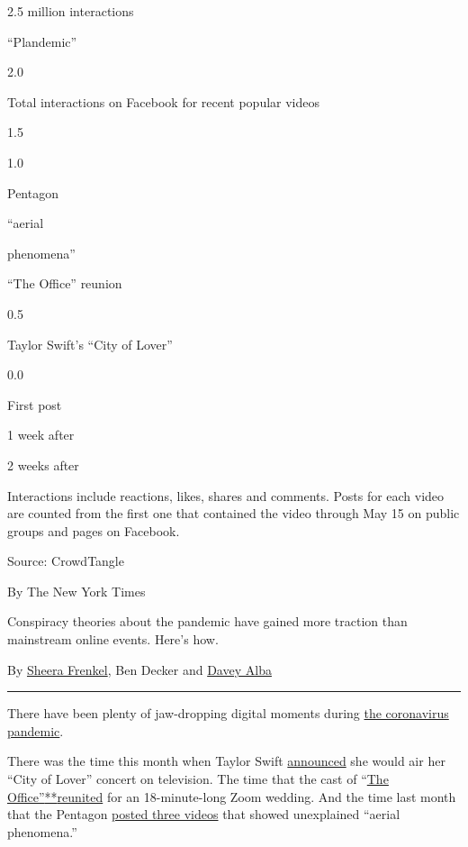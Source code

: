2.5 million interactions

``Plandemic''

2.0

Total interactions on Facebook for recent popular videos

1.5

1.0

Pentagon

``aerial

phenomena''

``The Office'' reunion

0.5

Taylor Swift's ``City of Lover''

0.0

First post

1 week after

2 weeks after

Interactions include reactions, likes, shares and comments. Posts for
each video are counted from the first one that contained the video
through May 15 on public groups and pages on Facebook.

Source: CrowdTangle

By The New York Times

Conspiracy theories about the pandemic have gained more traction than
mainstream online events. Here's how.

By \href{https://www.nytimes.com/by/sheera-frenkel}{Sheera Frenkel}, Ben
Decker and \href{https://www.nytimes.com/by/davey-alba}{Davey Alba}

\begin{center}\rule{0.5\linewidth}{\linethickness}\end{center}

There have been plenty of jaw-dropping digital moments during
\href{https://www.nytimes.com/news-event/coronavirus?action=click\&pgtype=Article\&state=default\&module=styln-coronavirus\&variant=show\&region=TOP_BANNER\&context=storylines_menu}{the
coronavirus pandemic}.

There was the time this month when Taylor Swift
\href{https://variety.com/2020/music/news/taylor-swift-city-lover-concert-paris-abc-special-1234601657/}{announced}
she would air her ``City of Lover'' concert on television. The time that
the cast of ``\href{https://www.youtube.com/watch?v=NDjNX3nEfYo}{The
Office''}\href{https://www.youtube.com/watch?v=NDjNX3nEfYo}{**}\href{https://www.youtube.com/watch?v=NDjNX3nEfYo}{reunited}
for an 18-minute-long Zoom wedding. And the time last month that the
Pentagon
\href{https://www.defense.gov/Newsroom/Releases/Release/Article/2165713/statement-by-the-department-of-defense-on-the-release-of-historical-navy-videos/}{posted
three videos} that showed unexplained ``aerial phenomena.''

